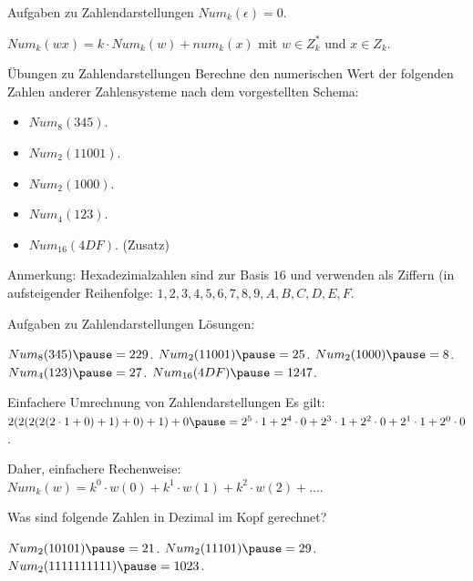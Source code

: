 \documentclass[handout]{beamer}
\begin{document}
\begin{frame}{Aufgaben zu Zahlendarstellungen}
	$Num_k(\epsilon) = 0$.
	
	$Num_k(wx) = k \cdot Num_k(w) + num_k(x)$ mit $w \in Z_k^*$ und $x \in Z_k$.
	
	\begin{taskblock}{Übungen zu Zahlendarstellungen}
		Berechne den numerischen Wert der folgenden Zahlen anderer Zahlensysteme nach dem vorgestellten Schema:
		\begin{itemize}
			\item $Num_8(345)$.
			\item $Num_2(11001)$.
			\item $Num_2(1000)$.
			\item $Num_4(123)$.
			\item $Num_{16}(4DF)$. (Zusatz)
		\end{itemize}
	\end{taskblock}

	Anmerkung: Hexadezimalzahlen sind zur Basis $16$ und verwenden als Ziffern (in aufsteigender Reihenfolge: $1, 2, 3, 4, 5, 6, 7, 8, 9, A, B, C, D, E, F$.
\end{frame}

\begin{frame}{Aufgaben zu Zahlendarstellungen}
	\pause Lösungen:
	\begin{itemize}
		\pitem $Num_8(345) \p = 229$.
		\pitem $Num_2(11001) \p = 25$.
		\pitem $Num_2(1000) \p = 8$.
		\pitem $Num_4(123) \p = 27$.
		\pitem $Num_{16}(4DF) \p = 1247$. 
	\end{itemize}
\end{frame}

\begin{frame}{Einfachere Umrechnung von Zahlendarstellungen}
	Es gilt: $2(2(2(2(2 \cdot 1 + 0)+1)+0)+1)+0 \p = 2^5 \cdot 1 + 2^4 \cdot 0 + 2^3 \cdot 1 + 2^2 \cdot 0 + 2^1 \cdot 1 + 2^0 \cdot 0$.
	
	\p Daher, einfachere Rechenweise: $Num_k(w) = k^0 \cdot w(0) + k^1 \cdot w(1) + k^2 \cdot w(2) + ...$.
	
	\p Was sind folgende Zahlen in Dezimal im Kopf gerechnet?
	
	\begin{itemize}
		\pitem $Num_2(10101) \p = 21$.
		\pitem $Num_2(11101) \p = 29$.
		\pitem $Num_2(1111111111) \p = 1023$.
	\end{itemize}
	
\end{frame}
		
\end{document}
